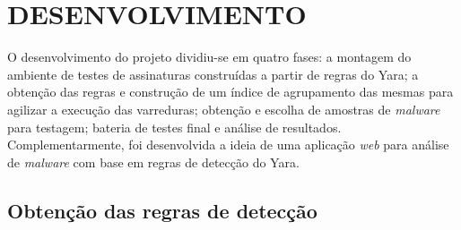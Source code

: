 \chapter{DESENVOLVIMENTO}
\label{c.Desenvolvimento}

O desenvolvimento do projeto dividiu-se em quatro fases: a montagem do ambiente de testes de assinaturas construídas a partir de regras do Yara; a obtenção das regras e construção de um índice de agrupamento das mesmas para agilizar a execução das varreduras; obtenção e escolha de amostras de \textit{malware} para testagem; bateria de testes final e análise de resultados. Complementarmente, foi desenvolvida a ideia de uma aplicação \textit{web} para análise de \textit{malware} com base em regras de detecção do Yara.

\section{Obtenção das regras de detecção}
\label{s.obtregras}




